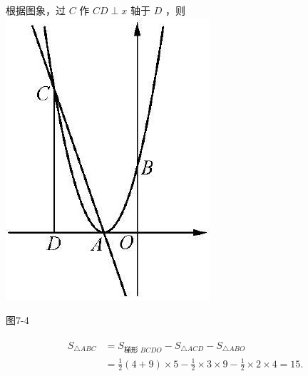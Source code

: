 \documentclass[10pt]{article}
\begin{document}
根据图象，过 $C$ 作 $C D \perp x$ 轴于 $D$ ，则\\
\includegraphics[max width=\textwidth, center]{2024_10_30_1bf34f7aeb61f11d11d3g-099}

图7-4

\begin{align*}
\begin{aligned}
S_{\triangle A B C} & =S_{\text {梯形 } B C D O}-S_{\triangle A C D}-S_{\triangle A B O} \\
& =\frac{1}{2}(4+9) \times 5-\frac{1}{2} \times 3 \times 9-\frac{1}{2} \times 2 \times 4=15 .
\end{aligned}
\end{align*}
\end{document}
